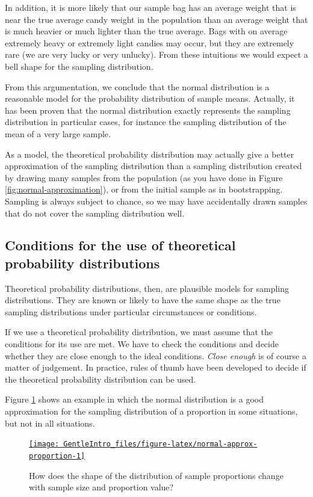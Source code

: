 \documentclass[a4paper]{book}
\theoremstyle{definition}
\theoremstyle{definition}
\theoremstyle{definition}
\theoremstyle{remark}
\begin{document}
In addition, it is more likely that our sample bag has an average weight
that is near the true average candy weight in the population than an
average weight that is much heavier or much lighter than the true
average. Bags with on average extremely heavy or extremely light candies
may occur, but they are extremely rare (we are very lucky or very
unlucky). From these intuitions we would expect a bell shape for the
sampling distribution.

From this argumentation, we conclude that the normal distribution is a
reasonable model for the probability distribution of sample means.
Actually, it has been proven that the normal distribution exactly
represents the sampling distribution in particular cases, for instance
the sampling distribution of the mean of a very large sample.

As a model, the theoretical probability distribution may actually give a
better approximation of the sampling distribution than a sampling
distribution created by drawing many samples from the population (as you
have done in Figure \ref{fig:normal-approximation}), or from the initial
sample as in bootstrapping. Sampling is always subject to chance, so we
may have accidentally drawn samples that do not cover the sampling
distribution well.

\subsection{Conditions for the use of theoretical probability
distributions}\label{cond-probdistr}

Theoretical probability distributions, then, are plausible models for
sampling distributions. They are known or likely to have the same shape
as the true sampling distributions under particular circumstances or
conditions.

If we use a theoretical probability distribution, we must assume that
the conditions for its use are met. We have to check the conditions and
decide whether they are close enough to the ideal conditions.
\emph{Close enough} is of course a matter of judgement. In practice,
rules of thumb have been developed to decide if the theoretical
probability distribution can be used.

Figure \ref{fig:normal-approx-proportion} shows an example in which the
normal distribution is a good approximation for the sampling
distribution of a proportion in some situations, but not in all
situations.

\begin{figure}[H]
\href{http://82.196.4.233:3838/apps/normal-approx-proportion/}{\texttt{[image: GentleIntro\_files/figure-latex/normal-approx-proportion-1]} }\caption{How does the shape of the distribution of sample proportions change with sample size and proportion value?}\label{fig:normal-approx-proportion}
\end{figure}
\end{document}
